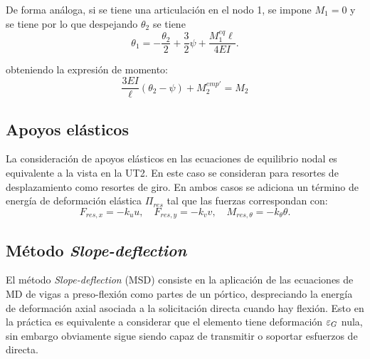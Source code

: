 De forma análoga, si se tiene una articulación en el nodo 1, se impone $M_1=0$ y se tiene
por lo que despejando $\theta_{2}$ se tiene
%
\begin{equation} \label{eqn:artictheta1}
\theta_1 = -\frac{\theta_2}{2} + \frac{3}{2} \psi + \frac{M_1^{eq} \ell }{4 EI}.
\end{equation}

obteniendo la expresión de momento:%
\begin{equation}
\boxed{
	\frac{3 EI}{\ell} \left( \theta_2 - \psi  \right) + M_2^{emp'} = M_2
}
\end{equation}


%
%
%
%

\subsection{Apoyos elásticos}

La consideración de apoyos elásticos en las ecuaciones de equilibrio nodal es equivalente a la vista en la UT2. En este caso se consideran para resortes de desplazamiento como resortes de giro. En ambos casos se adiciona un término de energía de deformación elástica $\Pi_{res}$ tal que  las fuerzas correspondan con:
%
\begin{equation}
F_{res,x} = -k_u u , \quad
F_{res,y} = -k_v v, 
\quad 
M_{res,\theta} = -k_\theta \theta.
\end{equation}


\subsection{Método \textit{Slope-deflection}}

El método \textit{Slope-deflection} (MSD) consiste en la aplicación de las ecuaciones de MD de vigas a preso-flexión como partes de un pórtico, despreciando la energía de deformación axial asociada a la solicitación directa cuando hay flexión. %
%
Esto en la práctica es equivalente a considerar que el elemento tiene deformación $\varepsilon_G$ nula, sin embargo obviamente sigue siendo capaz de transmitir o soportar esfuerzos de directa. %

